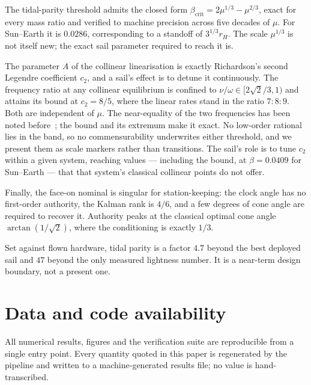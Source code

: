 \documentclass[11pt,a4paper]{article}
\begin{document}
The tidal-parity threshold admits the closed form
$\beta_{\mathrm{crit}}=2\mu^{1/3}-\mu^{2/3}$, exact for every mass ratio and
verified to machine precision across five decades of $\mu$. For Sun--Earth it is
$0.0286$, corresponding to a standoff of $3^{1/3}r_H$. The scale $\mu^{1/3}$ is
not itself new; the exact sail parameter required to reach it is.

The parameter $A$ of the collinear linearisation is exactly Richardson's
second Legendre coefficient $c_2$, and a sail's effect is to detune it
continuously. The frequency ratio at any collinear equilibrium is confined to
$\nu/\omega\in[2\sqrt2/3,1)$ and attains its bound at $c_2=8/5$, where the
linear rates stand in the ratio $7:8:9$. Both are independent of $\mu$. The
near-equality of the two frequencies has been noted
before~\cite{ceccaroni2016}; the bound and its extremum make it exact. No
low-order rational lies in the band, so no commensurability underwrites either
threshold, and we present them as scale markers rather than transitions. The
sail's role is to tune $c_2$ within a given system, reaching values ---
including the bound, at $\beta=0.0409$ for Sun--Earth --- that that system's
classical collinear points do not offer.

Finally, the face-on nominal is singular for station-keeping: the clock angle
has no first-order authority, the Kalman rank is $4/6$, and a few degrees of
cone angle are required to recover it. Authority peaks at the classical optimal
cone angle $\arctan(1/\sqrt2)$, where the conditioning is exactly $1/3$.

Set against flown hardware, tidal parity is a factor $4.7$ beyond the best
deployed sail and $47$ beyond the only measured lightness number. It is a
near-term design boundary, not a present one.

\section*{Data and code availability}

All numerical results, figures and the verification suite are reproducible from
a single entry point. Every quantity quoted in this paper is regenerated by the
pipeline and written to a machine-generated results file; no value is
hand-transcribed.



\end{document}

